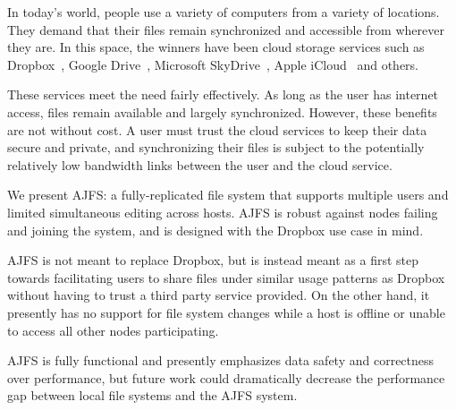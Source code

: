 
In today's world, people use a variety of computers from a variety of locations.
They demand that their files remain synchronized and accessible from wherever
they are. In this space, the winners have been cloud storage services such as
Dropbox~\cite{Dropbox}, Google Drive~\cite{googledrive}, Microsoft SkyDrive~\cite{skydrive}, Apple iCloud~\cite{icloud} and others.

These services meet the need fairly effectively. As long as the user has
internet access, files remain available and largely synchronized. However, these
benefits are not without cost. A user must trust the cloud services to keep
their data secure and private, and synchronizing their files is subject to the
potentially relatively low bandwidth links between the user and the cloud
service.

We present AJFS: a fully-replicated file system that supports multiple users and
limited simultaneous editing across hosts. AJFS is robust against nodes failing
and joining the system, and is designed with the Dropbox use case in mind.

AJFS is not meant to replace Dropbox, but is instead meant as a first step
towards facilitating users to share files under similar usage patterns as
Dropbox without having to trust a third party service provided. On the other
hand, it presently has no support for file system changes while a host is
offline or unable to access all other nodes participating.

AJFS is fully functional and presently emphasizes data safety and correctness
over performance, but future work could dramatically decrease the performance
gap between local file systems and the AJFS system.

